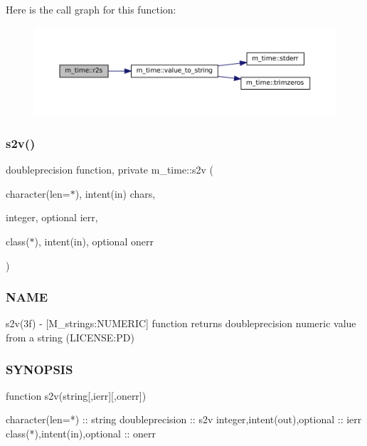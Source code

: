 Here is the call graph for this function\+:\nopagebreak
\begin{figure}[H]
\begin{center}
\leavevmode
\includegraphics[width=350pt]{namespacem__time_a6fdd4bf34977b7a390ce93c75c2cc6d8_cgraph}
\end{center}
\end{figure}
\mbox{\label{namespacem__time_a30c2f29f22d676ade9dff5ad6c35aae5}} 
\subsubsection{\texorpdfstring{s2v()}{s2v()}}
{\footnotesize\ttfamily doubleprecision function, private m\+\_\+time\+::s2v (\begin{DoxyParamCaption}\item[{character(len=$\ast$), intent(in)}]{chars,  }\item[{integer, optional}]{ierr,  }\item[{class($\ast$), intent(in), optional}]{onerr }\end{DoxyParamCaption})\hspace{0.3cm}{\ttfamily [private]}}



\subsubsection*{N\+A\+ME}

s2v(3f) -\/ \mbox{[}M\+\_\+strings\+:N\+U\+M\+E\+R\+IC\mbox{]} function returns doubleprecision numeric value from a string (L\+I\+C\+E\+N\+SE\+:PD) 

\subsubsection*{S\+Y\+N\+O\+P\+S\+IS}

\begin{DoxyVerb}function s2v(string[,ierr][,onerr])

 character(len=*)             :: string
 doubleprecision              :: s2v
 integer,intent(out),optional :: ierr
 class(*),intent(in),optional :: onerr
\end{DoxyVerb}
